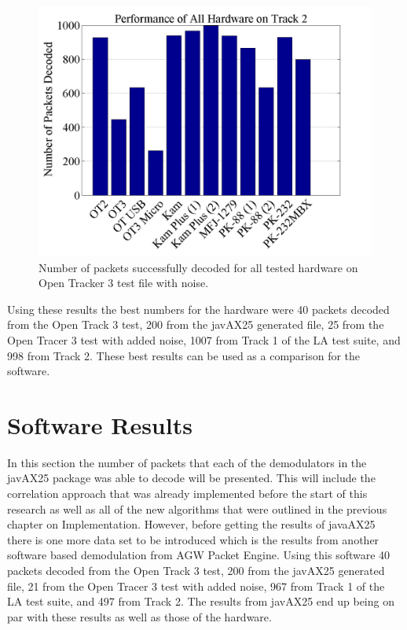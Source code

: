  \begin{figure}
  \centering
	\includegraphics[width=0.75\linewidth]{images/PerformanceofAllHardwareonTrack2.png} 
	\caption{Number of packets successfully decoded for all tested hardware on Open Tracker 3 test file with noise.}
   \label{allHardwareTrack2}
\end{figure}

Using these results the best numbers for the hardware were 40 packets decoded from the Open Track 3 test, 200 from the javAX25 generated file, 25 from the Open Tracer 3 test with added noise, 1007 from Track 1 of the LA test suite, and 998 from Track 2. These best results can be used as a comparison for the software.

\section{Software Results}
In this section the number of packets that each of the demodulators in the javAX25 package was able to decode will be presented. This will include the correlation approach that was already implemented before the start of this research as well as all of the new algorithms that were outlined in the previous chapter on Implementation. However, before getting the results of javaAX25 there is one more data set to be introduced which is the results from another software based demodulation from AGW Packet Engine. Using this software 40 packets decoded from the Open Track 3 test, 200 from the javAX25 generated file, 21 from the Open Tracer 3 test with added noise, 967 from Track 1 of the LA test suite, and 497 from Track 2. The results from javAX25 end up being on par with these results as well as those of the hardware.


